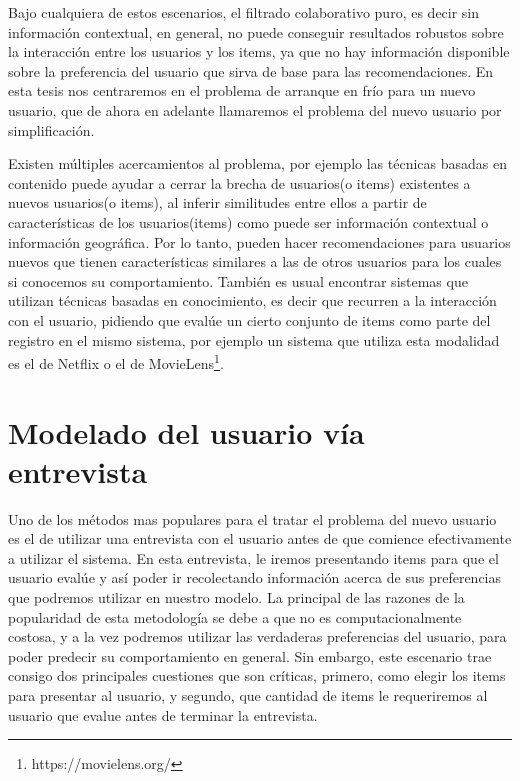 \documentclass[hidelinks,12pt,a4paper]{book}
\theoremstyle{plain}
\theoremstyle{definition}
\begin{document}
Bajo cualquiera de estos escenarios, el filtrado colaborativo puro, es decir sin información contextual, en general, no puede conseguir resultados robustos sobre la interacción entre los usuarios y los items, ya que no hay información disponible sobre la preferencia del usuario que sirva de base para las recomendaciones. En esta tesis nos centraremos en el problema de arranque en frío para un nuevo usuario, que de ahora en adelante llamaremos el problema del nuevo usuario por simplificación.

Existen múltiples acercamientos al problema, por ejemplo las técnicas basadas en contenido puede ayudar a cerrar la brecha de usuarios(o items) existentes a nuevos usuarios(o items), al inferir similitudes entre ellos a partir de características de los usuarios(items) como puede ser información contextual o información geográfica\cite{CS:schein2002methandmetrics}\cite{CS:New-son2016dealing}. Por lo tanto, pueden hacer recomendaciones para usuarios nuevos que tienen características similares a las de otros usuarios para los cuales si conocemos su comportamiento. También es usual encontrar sistemas que utilizan técnicas basadas en conocimiento, es decir que recurren a la interacción con el usuario, pidiendo que evalúe un cierto conjunto de items como parte del registro en el mismo sistema, por ejemplo un sistema que utiliza esta modalidad es el de Netflix o el de MovieLens\footnote{https://movielens.org/}\cite{CS:rashid2002getting}.


\section{Modelado del usuario vía entrevista}

Uno de los métodos mas populares para el tratar el problema del nuevo usuario es el de utilizar una entrevista con el usuario antes de que comience efectivamente a utilizar el sistema. En esta entrevista, le iremos presentando items para que el usuario evalúe y así poder ir recolectando información acerca de sus preferencias que podremos utilizar en nuestro modelo. La principal de las razones de la popularidad de esta metodología se debe a que no es computacionalmente costosa, y a la vez podremos utilizar las verdaderas preferencias del usuario, para poder predecir su comportamiento en general. Sin embargo, este escenario trae consigo dos principales cuestiones que son críticas, primero, como elegir los items para presentar al usuario, y segundo, que cantidad de items le requeriremos al usuario que evalue antes de terminar la entrevista.
\end{document}
